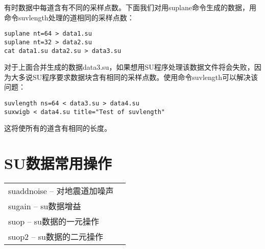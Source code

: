 \begin{enumerate}
	有时数据中每道含有不同的采样点数。下面我们对用suplane命令生成的数据，用命令suvlength处理的道相同的采样点数：
\begin{lstlisting}
suplane nt=64 > data1.su
suplane nt=32 > data2.su	
cat data1.su data2.su > data3.su
\end{lstlisting}
	对于上面合并生成的数据data3.su，如果想用SU程序处理该数据文件将会失败，因为大多说SU程序要求数据块含有相同的采样点数。使用命令suvlength可以解决该问题：
\begin{lstlisting}
suvlength ns=64 < data3.su > data4.su
suxwigb < data4.su title="Test of suvlength" 
\end{lstlisting}	
	这将使所有的道含有相同的长度。
\end{enumerate}

\section{SU数据常用操作}
\begin{tabular}{ll}
	\toprule
	suaddnoise – 对地震道加噪声\\
	sugain – su数据增益\\
	suop – su数据的一元操作\\
	suop2 – su数据的二元操作\\
	\bottomrule
\end{tabular}

